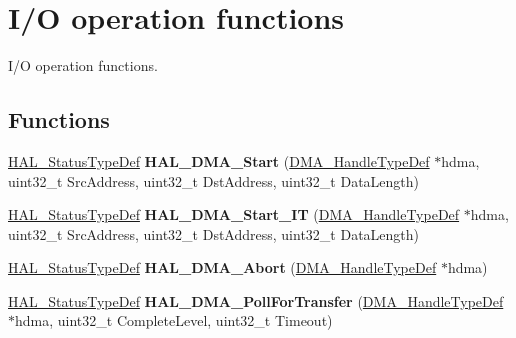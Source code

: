 \hypertarget{group___d_m_a___exported___functions___group2}{}\section{I/O operation functions}
\label{group___d_m_a___exported___functions___group2}


I/O operation functions.  


\subsection*{Functions}
\begin{DoxyCompactItemize}
\item 
\hyperlink{stm32f4xx__hal__def_8h_a63c0679d1cb8b8c684fbb0632743478f}{H\+A\+L\+\_\+\+Status\+Type\+Def} {\bfseries H\+A\+L\+\_\+\+D\+M\+A\+\_\+\+Start} (\hyperlink{group___d_m_a___exported___types_ga41b754a906b86bce54dc79938970138b}{D\+M\+A\+\_\+\+Handle\+Type\+Def} $\ast$hdma, uint32\+\_\+t Src\+Address, uint32\+\_\+t Dst\+Address, uint32\+\_\+t Data\+Length)\hypertarget{group___d_m_a___exported___functions___group2_ga96fbd9c285135f558fd9283a57406330}{}\label{group___d_m_a___exported___functions___group2_ga96fbd9c285135f558fd9283a57406330}

\item 
\hyperlink{stm32f4xx__hal__def_8h_a63c0679d1cb8b8c684fbb0632743478f}{H\+A\+L\+\_\+\+Status\+Type\+Def} {\bfseries H\+A\+L\+\_\+\+D\+M\+A\+\_\+\+Start\+\_\+\+IT} (\hyperlink{group___d_m_a___exported___types_ga41b754a906b86bce54dc79938970138b}{D\+M\+A\+\_\+\+Handle\+Type\+Def} $\ast$hdma, uint32\+\_\+t Src\+Address, uint32\+\_\+t Dst\+Address, uint32\+\_\+t Data\+Length)\hypertarget{group___d_m_a___exported___functions___group2_ga7eddc0931ac8a3d77b23d6d5e68407c7}{}\label{group___d_m_a___exported___functions___group2_ga7eddc0931ac8a3d77b23d6d5e68407c7}

\item 
\hyperlink{stm32f4xx__hal__def_8h_a63c0679d1cb8b8c684fbb0632743478f}{H\+A\+L\+\_\+\+Status\+Type\+Def} {\bfseries H\+A\+L\+\_\+\+D\+M\+A\+\_\+\+Abort} (\hyperlink{group___d_m_a___exported___types_ga41b754a906b86bce54dc79938970138b}{D\+M\+A\+\_\+\+Handle\+Type\+Def} $\ast$hdma)\hypertarget{group___d_m_a___exported___functions___group2_ga001f9fb04328a7460f9ff16908ff987c}{}\label{group___d_m_a___exported___functions___group2_ga001f9fb04328a7460f9ff16908ff987c}

\item 
\hyperlink{stm32f4xx__hal__def_8h_a63c0679d1cb8b8c684fbb0632743478f}{H\+A\+L\+\_\+\+Status\+Type\+Def} {\bfseries H\+A\+L\+\_\+\+D\+M\+A\+\_\+\+Poll\+For\+Transfer} (\hyperlink{group___d_m_a___exported___types_ga41b754a906b86bce54dc79938970138b}{D\+M\+A\+\_\+\+Handle\+Type\+Def} $\ast$hdma, uint32\+\_\+t Complete\+Level, uint32\+\_\+t Timeout)\hypertarget{group___d_m_a___exported___functions___group2_ga676b9606af3221a6b7bd7de264809fc7}{}\label{group___d_m_a___exported___functions___group2_ga676b9606af3221a6b7bd7de264809fc7}


\end{DoxyCompactItemize}
